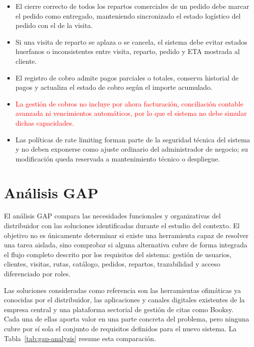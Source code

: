 \begin{itemize}
    \item El cierre correcto de todos los repartos comerciales de un pedido debe marcar el pedido como entregado, manteniendo sincronizado el estado logístico del pedido con el de la visita.
    \item Si una visita de reparto se aplaza o se cancela, el sistema debe evitar estados huerfanos o inconsistentes entre visita, reparto, pedido y ETA mostrada al cliente.
    \item El registro de cobro admite pagos parciales o totales, conserva historial de pagos y actualiza el estado de cobro según el importe acumulado.
    \item \textcolor{red}{La gestión de cobros no incluye por ahora facturación, conciliación contable avanzada ni vencimientos automáticos, por lo que el sistema no debe simular dichas capacidades.}
    \item Las políticas de rate limiting forman parte de la seguridad técnica del sistema y no deben exponerse como ajuste ordinario del administrador de negocio; su modificación queda reservada a mantenimiento técnico o despliegue.
\end{itemize}

\section{Análisis GAP}
El análisis GAP compara las necesidades funcionales y organizativas del distribuidor con las soluciones identificadas durante el estudio del contexto. El objetivo no es únicamente determinar si existe una herramienta capaz de resolver una tarea aislada, sino comprobar si alguna alternativa cubre de forma integrada el flujo completo descrito por los requisitos del sistema: gestión de usuarios, clientes, visitas, rutas, catálogo, pedidos, repartos, trazabilidad y acceso diferenciado por roles.

Las soluciones consideradas como referencia son las herramientas ofimáticas ya conocidas por el distribuidor, las aplicaciones y canales digitales existentes de la empresa central y una plataforma sectorial de gestión de citas como Booksy. Cada una de ellas aporta valor en una parte concreta del problema, pero ninguna cubre por sí sola el conjunto de requisitos definidos para el nuevo sistema. La Tabla~\ref{tab:gap-analysis} resume esta comparación.

